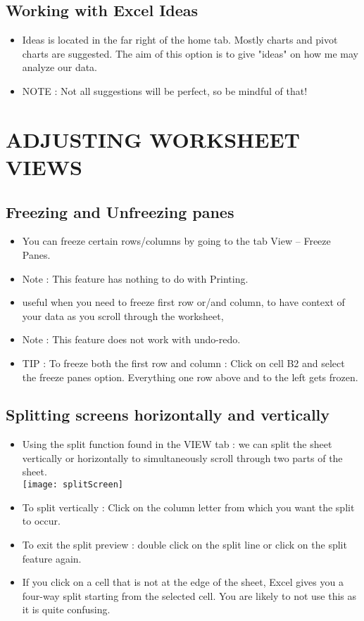 \documentclass[11pt, oneside]{article}   	%
\begin{document}
\subsection{Working with Excel Ideas}
\begin{itemize}
\item Ideas is located in the far right of the home tab. Mostly charts and pivot charts are suggested. The aim of this option is to give "ideas" on how me may analyze our data.
\item NOTE : Not all suggestions will be perfect, so be mindful of that!
\end{itemize}
\section{ADJUSTING WORKSHEET VIEWS}
\subsection{Freezing and Unfreezing panes}
\begin{itemize}
\item You can freeze certain rows/columns by going to the tab View -- Freeze Panes.
\item Note : This feature has nothing to do with Printing.
\item useful when you need to freeze first row or/and column, to have context of your data as you scroll through the worksheet,
\item Note : This feature does not work with undo-redo.
\item TIP : To freeze both the first row and column : Click on cell B2 and select the freeze panes option. Everything one row above and to the left gets frozen.
\end{itemize}
\subsection{Splitting screens horizontally and vertically}
\begin{itemize}
\item Using the split function found in the VIEW tab : we can split the sheet vertically or horizontally to simultaneously scroll through two parts of the sheet.
\bigskip\\
\texttt{[image: splitScreen]}
\bigskip\\
\item To split vertically : Click on the column letter from which you want the split to occur.
\item To exit the split preview : double click on the split line or click on the split feature again.
\item If you click on a cell that is not at the edge of the sheet, Excel gives you a four-way split starting from the selected cell. You are likely to not use this as it is quite confusing. 
\end{itemize}
\end{document}

